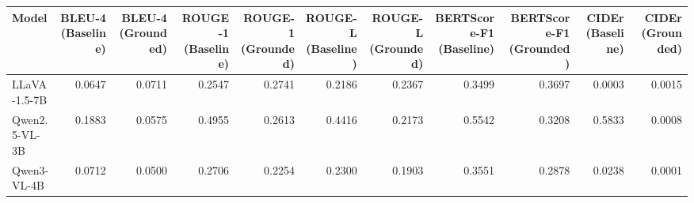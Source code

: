 \begin{tabular}{lrrrrrrrrrr}
\toprule
Model & BLEU-4 (Baseline) & BLEU-4 (Grounded) & ROUGE-1 (Baseline) & ROUGE-1 (Grounded) & ROUGE-L (Baseline) & ROUGE-L (Grounded) & BERTScore-F1 (Baseline) & BERTScore-F1 (Grounded) & CIDEr (Baseline) & CIDEr (Grounded) \\
\midrule
LLaVA-1.5-7B & 0.0647 & 0.0711 & 0.2547 & 0.2741 & 0.2186 & 0.2367 & 0.3499 & 0.3697 & 0.0003 & 0.0015 \\
Qwen2.5-VL-3B & 0.1883 & 0.0575 & 0.4955 & 0.2613 & 0.4416 & 0.2173 & 0.5542 & 0.3208 & 0.5833 & 0.0008 \\
Qwen3-VL-4B & 0.0712 & 0.0500 & 0.2706 & 0.2254 & 0.2300 & 0.1903 & 0.3551 & 0.2878 & 0.0238 & 0.0001 \\
\bottomrule
\end{tabular}
